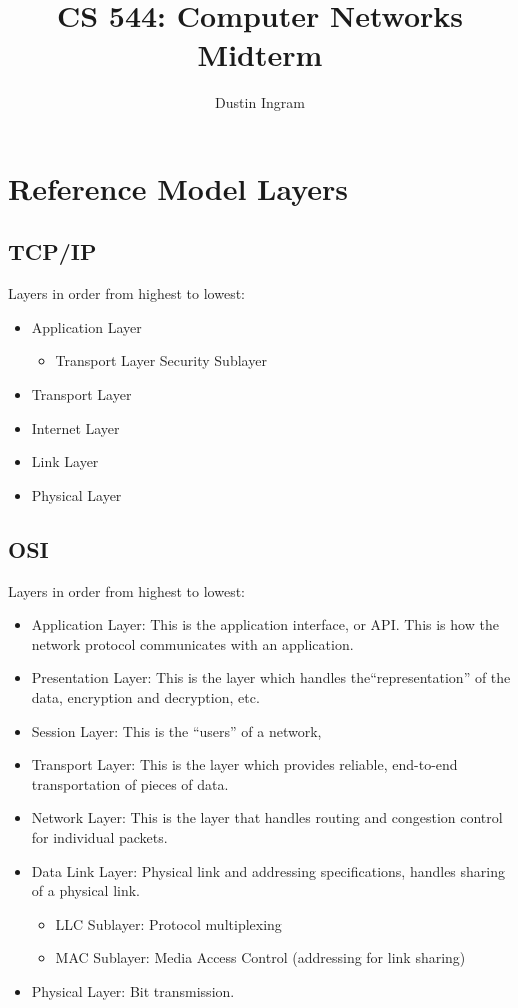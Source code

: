 \documentclass{article}
\title{CS 544: Computer Networks \\ Midterm}
\author{Dustin Ingram}
\begin{document}
\maketitle
\section{Reference Model Layers}
\subsection{TCP/IP}
Layers in order from highest to lowest:
\begin{itemize}
\item Application Layer
\begin{itemize}
\item Transport Layer Security Sublayer
\end{itemize}
\item Transport Layer
\item Internet Layer
\item Link Layer
\item Physical Layer
\end{itemize}
\subsection{OSI}
Layers in order from highest to lowest:
\begin{itemize}
\item Application Layer: This is the application interface, or API. This is how
the network protocol communicates with an application.
\item Presentation Layer: This is the layer which handles the``representation''
of the data, encryption and decryption, etc.
\item Session Layer: This is the ``users'' of a network, 
\item Transport Layer: This is the layer which provides reliable, end-to-end
transportation of pieces of data.
\item Network Layer: This is the layer that handles routing and congestion
control for individual packets. 
\item Data Link Layer: Physical link and addressing specifications, handles
sharing of a physical link.
\begin{itemize}
\item LLC Sublayer: Protocol multiplexing
\item MAC Sublayer: Media Access Control (addressing for link sharing) 
\end{itemize}
\item Physical Layer: Bit transmission. 
\end{itemize}
\end{document}
